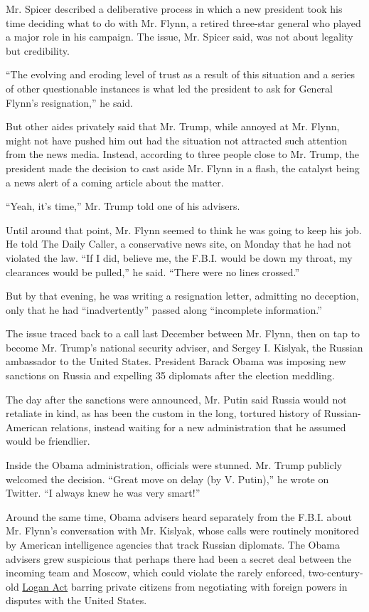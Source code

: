 Mr. Spicer described a deliberative process in which a new president
took his time deciding what to do with Mr. Flynn, a retired three-star
general who played a major role in his campaign. The issue, Mr. Spicer
said, was not about legality but credibility.

``The evolving and eroding level of trust as a result of this situation
and a series of other questionable instances is what led the president
to ask for General Flynn's resignation,'' he said.

But other aides privately said that Mr. Trump, while annoyed at Mr.
Flynn, might not have pushed him out had the situation not attracted
such attention from the news media. Instead, according to three people
close to Mr. Trump, the president made the decision to cast aside Mr.
Flynn in a flash, the catalyst being a news alert of a coming article
about the matter.

``Yeah, it's time,'' Mr. Trump told one of his advisers.

Until around that point, Mr. Flynn seemed to think he was going to keep
his job. He told The Daily Caller, a conservative news site, on Monday
that he had not violated the law. ``If I did, believe me, the F.B.I.
would be down my throat, my clearances would be pulled,'' he said.
``There were no lines crossed.''

But by that evening, he was writing a resignation letter, admitting no
deception, only that he had ``inadvertently'' passed along ``incomplete
information.''

The issue traced back to a call last December between Mr. Flynn, then on
tap to become Mr. Trump's national security adviser, and Sergey I.
Kislyak, the Russian ambassador to the United States. President Barack
Obama was imposing new sanctions on Russia and expelling 35 diplomats
after the election meddling.

The day after the sanctions were announced, Mr. Putin said Russia would
not retaliate in kind, as has been the custom in the long, tortured
history of Russian-American relations, instead waiting for a new
administration that he assumed would be friendlier.

Inside the Obama administration, officials were stunned. Mr. Trump
publicly welcomed the decision. ``Great move on delay (by V. Putin),''
he wrote on Twitter. ``I always knew he was very smart!''

Around the same time, Obama advisers heard separately from the F.B.I.
about Mr. Flynn's conversation with Mr. Kislyak, whose calls were
routinely monitored by American intelligence agencies that track Russian
diplomats. The Obama advisers grew suspicious that perhaps there had
been a secret deal between the incoming team and Moscow, which could
violate the rarely enforced, two-century-old
\href{https://www.nytimes.com/2017/02/14/us/politics/logan-act-flynn.html}{Logan
Act} barring private citizens from negotiating with foreign powers in
disputes with the United States.


